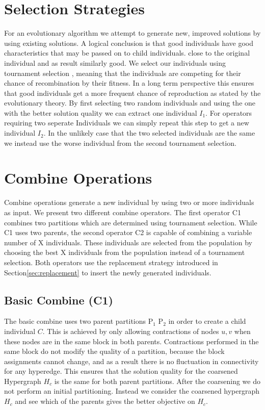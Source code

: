 \documentclass[a4paper,12pt,titlepage, BCOR7mm,headsepline]{scrbook}
\numberwithin{equation}{section}
\begin{document}
\section{Selection Strategies}
For an evolutionary algorithm we attempt to generate new, improved solutions by using existing solutions. A logical conclusion is that good individuals have good characteristics that may be passed on to child individuals.
close to the original individual and as result similarly good. We select our individuals using tournament selection \cite{blickle1996comparison}, meaning that the individuals are competing for their chance of recombination by their fitness. In a long term perspective this ensures that good individuals get a more frequent chance of reproduction as stated by the evolutionary theory.  By first selecting two random individuals and using the one with the better solution quality we can extract one individual $I_1$. For operators requiring two seperate Individuals we can simply repeat this step to get a new individual $I_2$. In the unlikely case that the two selected individuals are the same we instead use the worse individual from the second tournament selection.
\section{Combine Operations}
Combine operations generate a new individual by using two or more individuals as input. We present two different combine operators. The first operator C1 combines two partitions which are determined using tournament selection. While C1 uses two parents, the second operator C2 is capable of combining a variable number of X individuals. These individuals are selected from the population by choosing the best X individuals from the population instead of a tournament selection. Both operators use the replacement strategy introduced in Section\ref{sec:replacement} to insert the newly generated individuals.
\subsection{Basic Combine (C1)}
\label{sec:basiccombine}
The basic combine uses two parent partitions P$_1$ P$_2$ in order to create a child individual $C$. This is achieved by only allowing contractions of nodes $u, v$ when these nodes are in the same block in both parents. Contractions performed in the same block do not modify the quality of a partition, because the block assignments cannot change, and as a result there is no fluctuation in connectivity for any hyperedge.
This ensures that the solution quality for the coarsened Hypergraph $H_c$ is the same for both parent partitions.  
After the coarsening we do not perform an initial partitioning. Instead we consider the coarsened hypergraph $H_c$ and see which of the parents gives the better objective on $H_c$.
\end{document}
